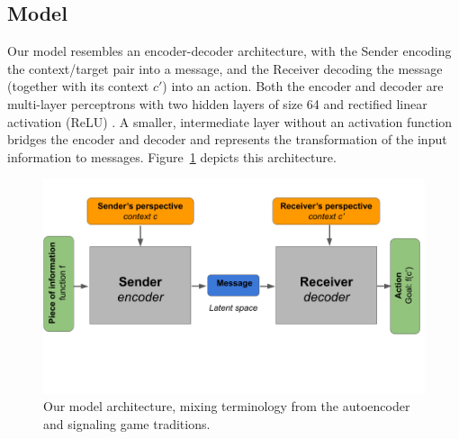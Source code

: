 \documentclass[11pt,a4paper]{article}
\DeclareMathOperator*{\argmax}{arg\,max}
\DeclareMathOperator*{\argmin}{arg\,min}
\newcommand{\nbSST}[1]{{\leavevmode\color{violet}{\scriptsize#1}}}
\begin{document}


\subsection{Model}

Our model resembles an encoder-decoder architecture, with the Sender encoding the context/target pair into a message, and the Receiver decoding the message (together with its context $c'$) into an action.  Both the encoder and decoder are multi-layer perceptrons with two hidden layers of size 64 and rectified linear activation (ReLU) \citep{Nair2010, Glorot2011}. A smaller, intermediate layer without an activation function bridges the encoder and decoder and represents the transformation of the input information to messages. Figure~\ref{fig:model} depicts this architecture.

\begin{figure}[ht]
	\centering
	\includegraphics[width=\columnwidth, trim=0 150 0 40]{figures/model_figure_v2.png}
	\caption{Our model architecture, mixing terminology from the autoencoder and signaling game traditions.}
	\label{fig:model}
\end{figure}
\end{document}
